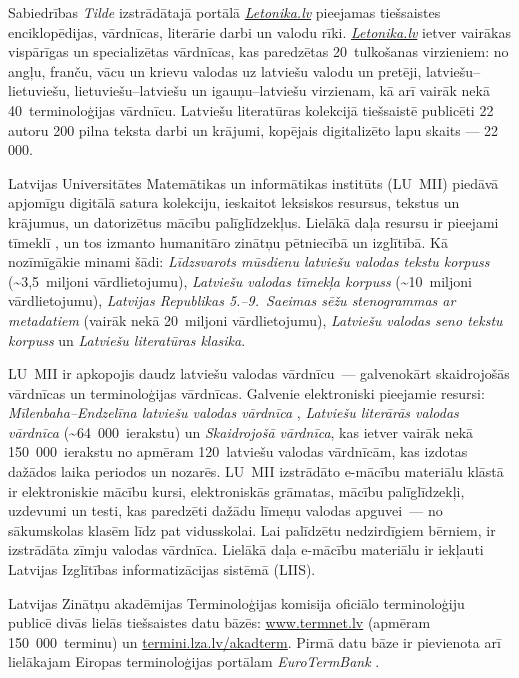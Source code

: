 \begin{multicols}{2}
Sabiedrības \textit{Tilde} izstrādātajā portālā \textit{\url{Letonika.lv}} pieejamas tiešsaistes enciklopēdijas, vārdnīcas, literārie darbi un valodu rīki.
\textit{\url{Letonika.lv}} ietver vairākas vispārīgas un specializētas vārdnīcas, kas paredzētas 20~tulkošanas virzieniem: no angļu, franču, vācu un krievu valodas uz latviešu valodu un pretēji, latviešu--lietuviešu, lietuviešu--latviešu un igauņu--latviešu virzienam, kā arī vairāk nekā 40~terminoloģijas vārdnīcu.
Latviešu literatūras kolekcijā tiešsaistē publicēti 22 autoru 200 pilna teksta darbi un krājumi, kopējais digitalizēto lapu skaits --- 22\,000.

Latvijas Universitātes Matemātikas un informātikas institūts (LU~MII) piedāvā apjomīgu digitālā satura \mbox{kolekciju}, ieskaitot leksiskos resursus, tekstus un krājumus, un datorizētus mācību palīglīdzekļus.
Lielākā daļa resursu ir pieejami tīmeklī \cite{Meta7}, un tos izmanto humanitāro zinātņu pētniecībā un izglītībā.
Kā nozīmīgākie minami šādi: \textit{Līdzsvarots mūsdienu latviešu valodas tekstu korpuss} \cite{Meta8} ${}^{ }$(\~{}3,5~miljoni vārdlietojumu), \textit{Latviešu valodas tīmekļa korpuss} (\~{}10~miljoni vārdlietojumu), \textit{Latvijas Republikas 5.--9.~Saeimas sēžu stenogrammas ar metadatiem} (vairāk nekā 20~miljoni vārdlietojumu), \textit{Latviešu valodas seno tekstu korpuss} \cite{Meta9, metaAndronova} un \textit{Latviešu literatūras klasika}.

LU~MII ir apkopojis daudz latviešu valodas vārd\-nīcu~--- galvenokārt skaidrojošās vārdnīcas un terminoloģijas vārdnīcas.
Galvenie elektroniski pieejamie resursi: \textit{Mīlenbaha--Endzelīna latviešu valodas vārdnīca} \cite{Meta10}, \textit{Latviešu literārās valodas vārdnīca} (\~{}64~000~ierakstu) un \textit{Skaidrojošā vārdnīca}, kas ietver vairāk nekā 150~000~ierakstu no apmēram 120~latviešu valodas vārdnīcām, kas izdotas dažādos laika periodos un nozarēs. 
LU~MII izstrādāto e-mācību materiālu klāstā ir elektroniskie mācību kursi, elektroniskās grāmatas, mācību palīglīdzekļi, uzdevumi un testi, kas paredzēti dažādu līmeņu valodas apguvei~--- no sākumskolas klasēm līdz pat vidusskolai.
Lai palīdzētu nedzirdīgiem bērniem, ir izstrādāta zīmju valodas vārdnīca.
Lielākā daļa e-mācību materiālu ir iekļauti Latvijas Izglītības informatizācijas sistēmā (LIIS). 

Latvijas Zinātņu akadēmijas Terminoloģijas komisija oficiālo terminoloģiju publicē divās lielās tiešsaistes datu bāzēs: \url{www.termnet.lv} (apmēram 150~000~terminu) un \url{termini.lza.lv/akadterm}.
Pirmā datu bāze ir \mbox{pievienota} arī lielākajam Eiropas terminoloģijas portālam \textit{EuroTermBank} \cite{Meta61}.


\end{multicols}
